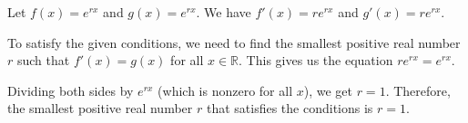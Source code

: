 Let $f(x) = e^{rx}$ and $g(x) = e^{rx}$. We have $f'(x) = re^{rx}$ and $g'(x) = re^{rx}$. 

To satisfy the given conditions, we need to find the smallest positive real number $r$ such that $f'(x) = g(x)$ for all $x \in \mathbb{R}$. This gives us the equation $re^{rx} = e^{rx}$.

Dividing both sides by $e^{rx}$ (which is nonzero for all $x$), we get $r = 1$. Therefore, the smallest positive real number $r$ that satisfies the conditions is $r = 1$.
